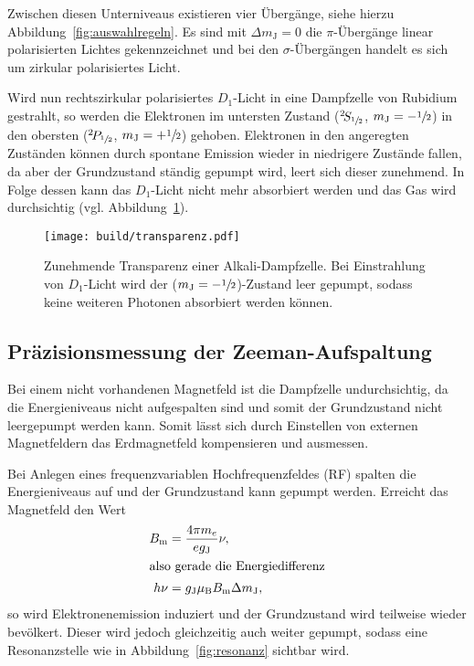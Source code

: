 Zwischen diesen Unterniveaus existieren vier Übergänge, siehe hierzu
Abbildung~\ref{fig:auswahlregeln}.
Es sind mit $\Delta m_\text{J} = 0$ die $\pi$-Übergänge linear polarisierten
Lichtes gekennzeichnet und bei den $\sigma$-Übergängen handelt es sich um
zirkular polarisiertes Licht.

Wird nun rechtszirkular polarisiertes $D_1$-Licht in eine Dampfzelle von Rubidium
gestrahlt, so werden die Elektronen im untersten Zustand
(${}^2\!S_{\sfrac{1}{2}}$, $m_\text{J} = - \sfrac{1}{2}$)
in den obersten
(${}^2\!P_{\sfrac{1}{2}}$, $m_\text{J} = + \sfrac{1}{2}$)
gehoben.
Elektronen in den angeregten Zuständen können durch spontane Emission wieder
in niedrigere Zustände fallen,
da aber der Grundzustand ständig gepumpt wird,
leert sich dieser zunehmend.
In Folge dessen kann das $D_1$-Licht nicht mehr absorbiert werden und das Gas
wird durchsichtig (vgl. Abbildung~\ref{fig:transparenz}).

\begin{figure}[ht]
  \centering
  \texttt{[image: build/transparenz.pdf]}
  \caption{%
    Zunehmende Transparenz einer Alkali-Dampfzelle.\cite{anleitung}
    Bei Einstrahlung von $D_1$-Licht wird der ($m_\text{J}
    = - \sfrac{1}{2}$)-Zustand leer gepumpt, sodass keine weiteren Photonen
    absorbiert werden können.
  }
  \label{fig:transparenz}
\end{figure}




\subsection{Präzisionsmessung der Zeeman-Aufspaltung}%
\label{sub:prazisionsmessung_der_zeeman_aufspaltung}

Bei einem nicht vorhandenen Magnetfeld ist die Dampfzelle undurchsichtig,
da die Energieniveaus nicht aufgespalten sind und somit der Grundzustand nicht
leergepumpt werden kann.
Somit lässt sich durch Einstellen von externen Magnetfeldern das Erdmagnetfeld
kompensieren und ausmessen.

Bei Anlegen eines frequenzvariablen Hochfrequenzfeldes (RF) spalten die
Energieniveaus auf
und der Grundzustand kann gepumpt werden.
Erreicht das Magnetfeld den Wert
\begin{align}
  B_\text{m} &= \frac{4 \pi m_e}{e g_\text{J}} \nu, \\
  \intertext{also gerade die Energiedifferenz}
  h \nu &= g_\text{J} \mu_\text{B} B_\text{m} \Delta m_\text{J},
\end{align}
so wird Elektronenemission induziert und der Grundzustand wird teilweise wieder
bevölkert.
Dieser wird jedoch gleichzeitig auch weiter gepumpt, sodass eine
Resonanzstelle wie in Abbildung~\ref{fig:resonanz} sichtbar wird.

